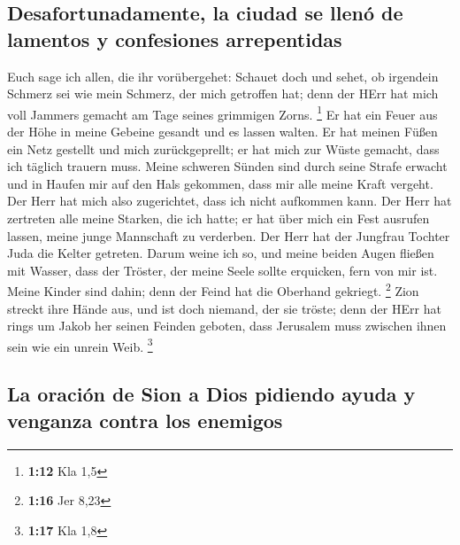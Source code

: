 \hypertarget{desafortunadamente-la-ciudad-se-llenuxf3-de-lamentos-y-confesiones-arrepentidas}{%
\subsection{Desafortunadamente, la ciudad se llenó de lamentos y
confesiones
arrepentidas}\label{desafortunadamente-la-ciudad-se-llenuxf3-de-lamentos-y-confesiones-arrepentidas}}

 Euch sage ich allen, die ihr vorübergehet: Schauet doch
und sehet, ob irgendein Schmerz sei wie mein Schmerz, der mich getroffen
hat; denn der HErr hat mich voll Jammers gemacht am Tage seines
grimmigen Zorns. \footnote{\textbf{1:12} Kla 1,5}  Er hat
ein Feuer aus der Höhe in meine Gebeine gesandt und es lassen walten. Er
hat meinen Füßen ein Netz gestellt und mich zurückgeprellt; er hat mich
zur Wüste gemacht, dass ich täglich trauern muss.  Meine
schweren Sünden sind durch seine Strafe erwacht und in Haufen mir auf
den Hals gekommen, dass mir alle meine Kraft vergeht. Der Herr hat mich
also zugerichtet, dass ich nicht aufkommen kann.  Der
Herr hat zertreten alle meine Starken, die ich hatte; er hat über mich
ein Fest ausrufen lassen, meine junge Mannschaft zu verderben. Der Herr
hat der Jungfrau Tochter Juda die Kelter getreten.  Darum
weine ich so, und meine beiden Augen fließen mit Wasser, dass der
Tröster, der meine Seele sollte erquicken, fern von mir ist. Meine
Kinder sind dahin; denn der Feind hat die Oberhand gekriegt. \footnote{\textbf{1:16}
  Jer 8,23}  Zion streckt ihre Hände aus, und ist doch
niemand, der sie tröste; denn der HErr hat rings um Jakob her seinen
Feinden geboten, dass Jerusalem muss zwischen ihnen sein wie ein unrein
Weib. \footnote{\textbf{1:17} Kla 1,8}

\hypertarget{la-oraciuxf3n-de-sion-a-dios-pidiendo-ayuda-y-venganza-contra-los-enemigos}{%
\subsection{La oración de Sion a Dios pidiendo ayuda y venganza contra
los
enemigos}\label{la-oraciuxf3n-de-sion-a-dios-pidiendo-ayuda-y-venganza-contra-los-enemigos}}

